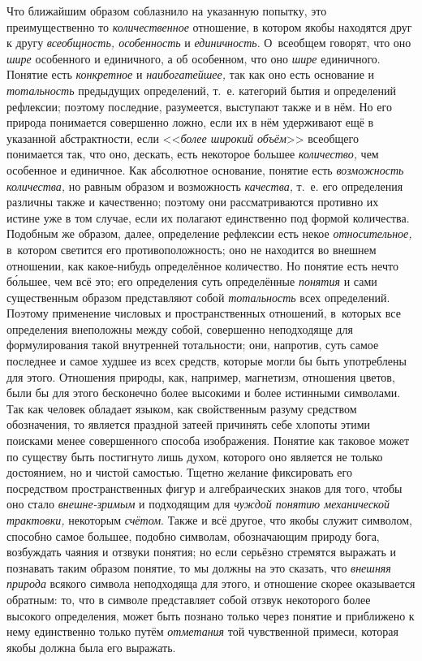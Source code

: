 Что ближайшим образом соблазнило на указанную попытку, это
преимущественно то {\em количественное}
отношение, в котором якобы находятся друг к другу
{\em всеобщность, особенность} и {\em единичность}.
О~всеобщем говорят, что оно {\em шире}
особенного и единичного, а об особенном, что оно
{\em шире} единичного. Понятие есть {\em конкретное}
и {\em наибогатейшее,} так как оно есть основание и {\em тотальность}
предыдущих определений, т.~е. категорий бытия и определений
рефлексии; поэтому последние, разумеется, выступают также и в нём. Но его
природа понимается совершенно ложно, если их в нём удерживают ещё в
указанной абстрактности, если <<{\em более широкий объём}>>
всеобщего понимается так, что оно, дескать, есть некоторое
большее {\em количество,} чем особенное и единичное. Как абсолютное
основание, понятие есть {\em возможность количества,}
но равным образом и возможность {\em качества,} т.~е. его
определения различны также и качественно; поэтому они рассматриваются
противно их истине уже в том случае, если их полагают единственно под
формой количества. Подобным же образом, далее, определение рефлексии есть
некое {\em относительное,}
в~котором светится его противоположность; оно не находится во
внешнем отношении, как какое-нибудь определённое количество. Но понятие
есть нечто б\'{о}льшее, чем всё это; его определения суть определённые
{\em понятия} и сами существенным образом представляют собой {\em тотальность}
всех определений. Поэтому применение числовых и пространственных отношений,
в~которых все определения внеположны между собой, совершенно неподходяще для
формулирования такой внутренней тотальности; они, напротив, суть самое
последнее и самое худшее из всех средств, которые могли бы быть употреблены
для этого. Отношения природы, как, например, магнетизм, отношения цветов,
были бы для этого бесконечно более высокими и более истинными символами.
Так как человек обладает языком, как свойственным разуму средством
обозначения, то является праздной затеей причинять себе
хлопоты этими поисками менее совершенного способа изображения. Понятие как
таковое может по существу быть постигнуто лишь духом, которого оно является
не только достоянием, но и чистой самостью. Тщетно желание фиксировать его
посредством пространственных фигур и алгебраических знаков для того, чтобы
оно стало {\em внешне-зримым} и подходящим для {\em чуждой понятию
механической трактовки,} некоторым {\em счётом}. Также и всё
другое, что якобы служит символом, способно самое большее, подобно
символам, обозначающим природу бога, возбуждать чаяния и отзвуки понятия;
но если серьёзно стремятся выражать и познавать таким образом понятие, то
мы должны на это сказать, что {\em внешняя природа}
всякого символа неподходяща для этого, и отношение скорее
оказывается обратным: то, что в символе представляет собой отзвук
некоторого более высокого определения, может быть познано только через
понятие и приближено к нему единственно только путём {\em отметания} той
чувственной примеси, которая якобы должна была его выражать.

